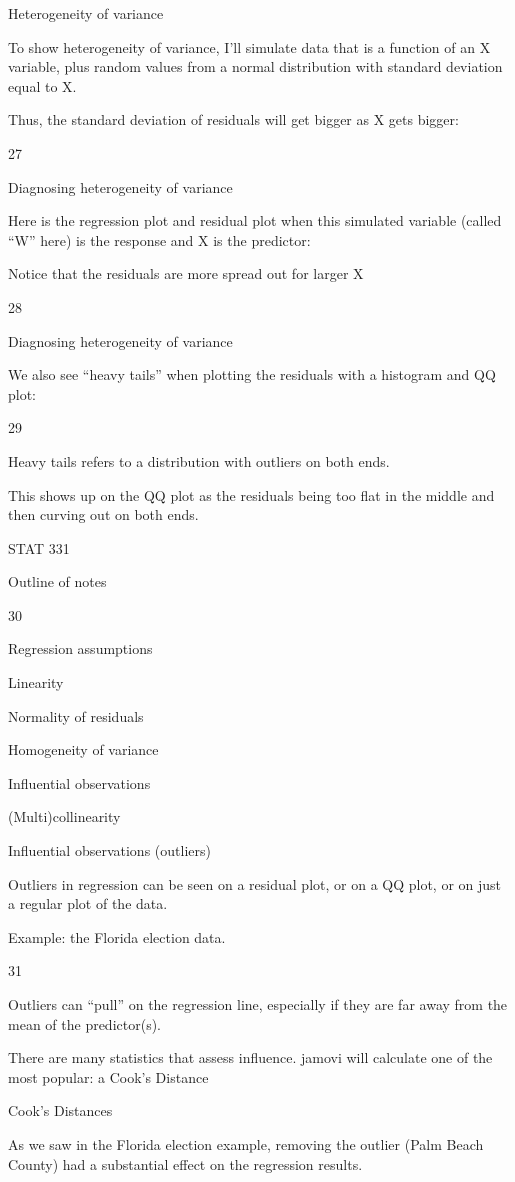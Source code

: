 \documentclass[
  letterpaper,
  DIV=11,
  numbers=noendperiod]{scrreprt}
\begin{document}
Heterogeneity of variance

To show heterogeneity of variance, I'll simulate data that is a function
of an X variable, plus random values from a normal distribution with
standard deviation equal to X.

Thus, the standard deviation of residuals will get bigger as X gets
bigger:

27

Diagnosing heterogeneity of variance

Here is the regression plot and residual plot when this simulated
variable (called ``W'' here) is the response and X is the predictor:

Notice that the residuals are more spread out for larger X

28

Diagnosing heterogeneity of variance

We also see ``heavy tails'' when plotting the residuals with a histogram
and QQ plot:

29

Heavy tails refers to a distribution with outliers on both ends.

This shows up on the QQ plot as the residuals being too flat in the
middle and then curving out on both ends.

STAT 331

Outline of notes

30

Regression assumptions

Linearity

Normality of residuals

Homogeneity of variance

Influential observations

(Multi)collinearity

Influential observations (outliers)

Outliers in regression can be seen on a residual plot, or on a QQ plot,
or on just a regular plot of the data.

Example: the Florida election data.

31

Outliers can ``pull'' on the regression line, especially if they are far
away from the mean of the predictor(s).

There are many statistics that assess influence. jamovi will calculate
one of the most popular: a Cook's Distance

Cook's Distances

As we saw in the Florida election example, removing the outlier (Palm
Beach County) had a substantial effect on the regression results.
\end{document}
